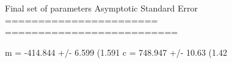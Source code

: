 Final set of parameters            Asymptotic Standard Error
=======================            ==========================

m               = -414.844         +/- 6.599        (1.591%
c               = 748.947          +/- 10.63        (1.42%
